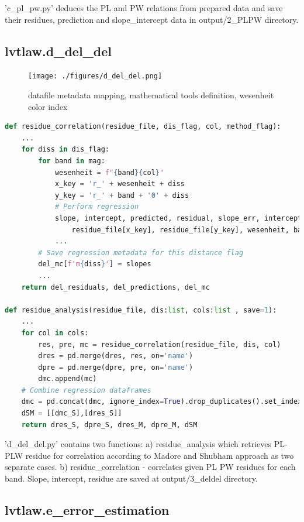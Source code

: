 \documentclass{article}
\begin{document}
'c\_pl\_pw.py' deduces the PL and PW relations from prepared data and save their residues, prediction and slope\_intercept data in output/2\_PLPW directory.


\newpage
\subsection{lvtlaw.d\_del\_del}
\begin{figure}[h!]
\caption{\small datafile metadata mapping, mathematical tools definition, wesenheit color index}
\texttt{[image: ./figures/d\_del\_del.png]}
\end{figure}


\begin{lstlisting}[language=Python, caption=dependencies for main.py]
def residue_correlation(residue_file, dis_flag, col, method_flag):
    ...
    for diss in dis_flag:
        for band in mag:
            wesenheit = f"{band}{col}" 
            x_key = 'r_' + wesenheit + diss
            y_key = 'r_' + band + '0' + diss
            # Perform regression
            slope, intercept, predicted, residual, slope_err, intercept_err = regression(
                residue_file[x_key], residue_file[y_key], wesenheit, band + '0' + diss, 1)
            ...
        # Save regression metadata for this distance flag
        del_mc[f'm{diss}'] = slopes
        ...
    return del_residuals, del_predictions, del_mc

def residue_analysis(residue_file, dis:list, cols:list , save=1):
    ...
    for col in cols:
        res, pre, mc = residue_correlation(residue_file, dis, col)
        dres = pd.merge(dres, res, on='name')
        dpre = pd.merge(dpre, pre, on='name')
        dmc.append(mc)
    # Combine regression dataframes
    dmc = pd.concat(dmc, ignore_index=True).drop_duplicates().set_index('name').T
    dSM = [[dmc_S],[dres_S]]
    return dres_S, dpre_S, dres_M, dpre_M, dSM

\end{lstlisting}

'd\_del\_del.py' contains two functions: a) residue\_analysis which retrieves PL-PLW residue for correlation according to Madore and Shubham approach as two separate cases. b) residue\_correlation - correlates given PL PW residues for each band. Slope, intercept, residue are saved at output/3\_deldel directory.


\newpage
\subsection{lvtlaw.e\_error\_estimation}
\end{document}
